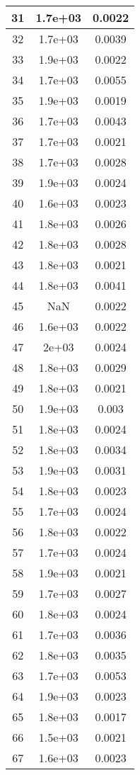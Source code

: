\begin{tabularx}{0.45\textwidth}{c|c|c}
31 & 1.7e+03 & 0.0022\\ \hline
32 & 1.7e+03 & 0.0039\\ \hline
33 & 1.9e+03 & 0.0022\\ \hline
34 & 1.7e+03 & 0.0055\\ \hline
35 & 1.9e+03 & 0.0019\\ \hline
36 & 1.7e+03 & 0.0043\\ \hline
37 & 1.7e+03 & 0.0021\\ \hline
38 & 1.7e+03 & 0.0028\\ \hline
39 & 1.9e+03 & 0.0024\\ \hline
40 & 1.6e+03 & 0.0023\\ \hline
41 & 1.8e+03 & 0.0026\\ \hline
42 & 1.8e+03 & 0.0028\\ \hline
43 & 1.8e+03 & 0.0021\\ \hline
44 & 1.8e+03 & 0.0041\\ \hline
45 & NaN & 0.0022\\ \hline
46 & 1.6e+03 & 0.0022\\ \hline
47 & 2e+03 & 0.0024\\ \hline
48 & 1.8e+03 & 0.0029\\ \hline
49 & 1.8e+03 & 0.0021\\ \hline
50 & 1.9e+03 & 0.003\\ \hline
51 & 1.8e+03 & 0.0024\\ \hline
52 & 1.8e+03 & 0.0034\\ \hline
53 & 1.9e+03 & 0.0031\\ \hline
54 & 1.8e+03 & 0.0023\\ \hline
55 & 1.7e+03 & 0.0024\\ \hline
56 & 1.8e+03 & 0.0022\\ \hline
57 & 1.7e+03 & 0.0024\\ \hline
58 & 1.9e+03 & 0.0021\\ \hline
59 & 1.7e+03 & 0.0027\\ \hline
60 & 1.8e+03 & 0.0024\\ \hline
61 & 1.7e+03 & 0.0036\\ \hline
62 & 1.8e+03 & 0.0035\\ \hline
63 & 1.7e+03 & 0.0053\\ \hline
64 & 1.9e+03 & 0.0023\\ \hline
65 & 1.8e+03 & 0.0017\\ \hline
66 & 1.5e+03 & 0.0021\\ \hline
67 & 1.6e+03 & 0.0023\\ \hline

\end{tabularx}
